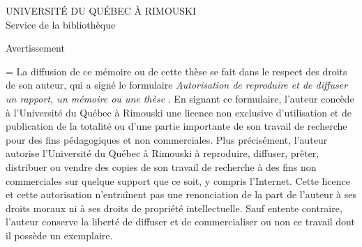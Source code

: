 \thispagestyle{empty}

{
\begin{center}
UNIVERSITÉ DU QUÉBEC À RIMOUSKI\\
Service de la bibliothèque
\end{center}
}
\vspace{3cm}
\begin{center}
Avertissement
\vspace{1.5cm}
\end{center}
{
\emergencystretch=\maxdimen
{}
\noindent La diffusion de ce mémoire ou de cette thèse se fait dans le respect des droits de son auteur, qui a signé le formulaire {\itshape \og Autorisation de reproduire et de diffuser un rapport, un mémoire ou une thèse \fg}. 
En signant ce formulaire, l’auteur concède à l’Université du Québec à Rimouski une licence non exclusive d’utilisation et de publication de la totalité ou d’une partie importante de son travail de recherche pour des fins pédagogiques et non commerciales. 
Plus précisément, l’auteur autorise l’Université du Québec à Rimouski à reproduire, diffuser, prêter, distribuer ou vendre des copies de son travail de recherche à des fins non commerciales sur quelque support que ce soit, y compris l’Internet. 
Cette licence et cette autorisation n’entraînent pas une renonciation de la part de l’auteur à ses droits moraux ni à ses droits de propriété intellectuelle. 
Sauf entente contraire, l’auteur conserve la liberté de diffuser et de commercialiser ou non ce travail dont il possède un exemplaire.\par
}
 \restoregeometry